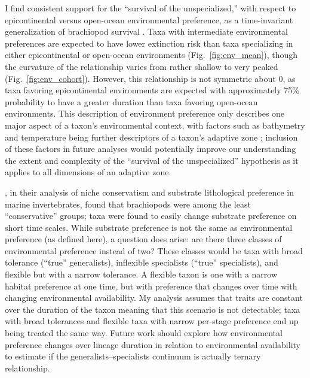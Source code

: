 \documentclass[11pt]{article}
\begin{document}
I find consistent support for the ``survival of the unspecialized,'' with respect to epicontinental versus open-ocean environmental preference, as a time-invariant generalization of brachiopod survival \citep{Simpson1944}. Taxa with intermediate environmental preferences are expected to have lower extinction risk than taxa specializing in either epicontinental or open-ocean environments (Fig.~\ref{fig:env_mean}), though the curvature of the relationship varies from rather shallow to very peaked (Fig.~\ref{fig:env_cohort}). However, this relationship is not symmetric about 0, as taxa favoring epicontinental environments are expected with approximately 75\% probability to have a greater duration than taxa favoring open-ocean environments. This description of environment preference only describes one major aspect of a taxon's environmental context, with factors such as bathymetry and temperature being further descriptors of a taxon's adaptive zone \citep{Nurnberg2013a,Harnik2013,Harnik2011,Heim2011}; inclusion of these factors in future analyses would potentially improve our understanding the extent and complexity of the ``survival of the unspecialized'' hypothesis as it applies to all dimensions of an adaptive zone.

\citet{Hopkins2014a}, in their analysis of niche conservatism and substrate lithological preference in marine invertebrates, found that brachiopods were among the least ``conservative'' groups; taxa were found to easily change substrate preference on short time scales. While substrate preference is not the same as environmental preference (as defined here), a question does arise: are there three classes of environmental preference instead of two? These classes would be taxa with broad tolerance (``true'' generalists), inflexible specialists (``true'' specialists), and flexible but with a narrow tolerance. A flexible taxon is one with a narrow habitat preference at one time, but with preference that changes over time with changing environmental availability. My analysis assumes that traits are constant over the duration of the taxon meaning that this scenario is not detectable; taxa with broad tolerances and flexible taxa with narrow per-stage preference end up being treated the same way. Future work should explore how environmental preference changes over lineage duration in relation to environmental availability to estimate if the generalists--specialists continuum is actually ternary relationship.
\end{document}
